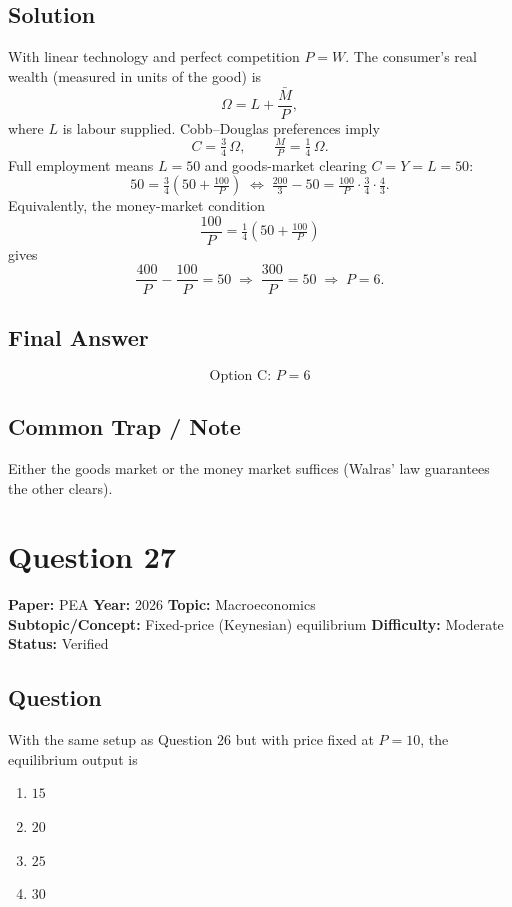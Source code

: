 \documentclass[11pt]{article}
\begin{document}
\subsection*{Solution}
With linear technology and perfect competition $P = W$. The consumer's real
wealth (measured in units of the good) is
\[
\Omega = L + \frac{\bar M}{P},
\]
where $L$ is labour supplied. Cobb--Douglas preferences imply
\[
C = \tfrac{3}{4}\,\Omega, \qquad \tfrac{M}{P} = \tfrac{1}{4}\,\Omega.
\]
Full employment means $L = 50$ and goods-market clearing $C = Y = L = 50$:
\[
50 = \tfrac{3}{4}\!\left(50 + \tfrac{100}{P}\right) \;\Longleftrightarrow\;
\tfrac{200}{3} - 50 = \tfrac{100}{P}\cdot \tfrac{3}{4}\cdot\tfrac{4}{3}.
\]
Equivalently, the money-market condition
\[
\frac{100}{P} = \tfrac{1}{4}\!\left(50 + \tfrac{100}{P}\right)
\]
gives
\[
\frac{400}{P} - \frac{100}{P} = 50 \;\Longrightarrow\; \frac{300}{P} = 50
\;\Longrightarrow\; P = 6.
\]

\subsection*{Final Answer}
\[
\boxed{\text{Option C: } P = 6}
\]

\subsection*{Common Trap / Note}
Either the goods market or the money market suffices (Walras' law guarantees the other clears).

\section*{Question 27}
\textbf{Paper:} PEA \quad \textbf{Year:} 2026 \quad \textbf{Topic:} Macroeconomics \\
\textbf{Subtopic/Concept:} Fixed-price (Keynesian) equilibrium \quad
\textbf{Difficulty:} Moderate \quad \textbf{Status:} Verified

\subsection*{Question}
With the same setup as Question 26 but with price fixed at $P = 10$,
the equilibrium output is
\begin{enumerate}[label=(\Alph*)]
\item $15$ \item $20$ \item $25$ \item $30$
\end{enumerate}
\end{document}
